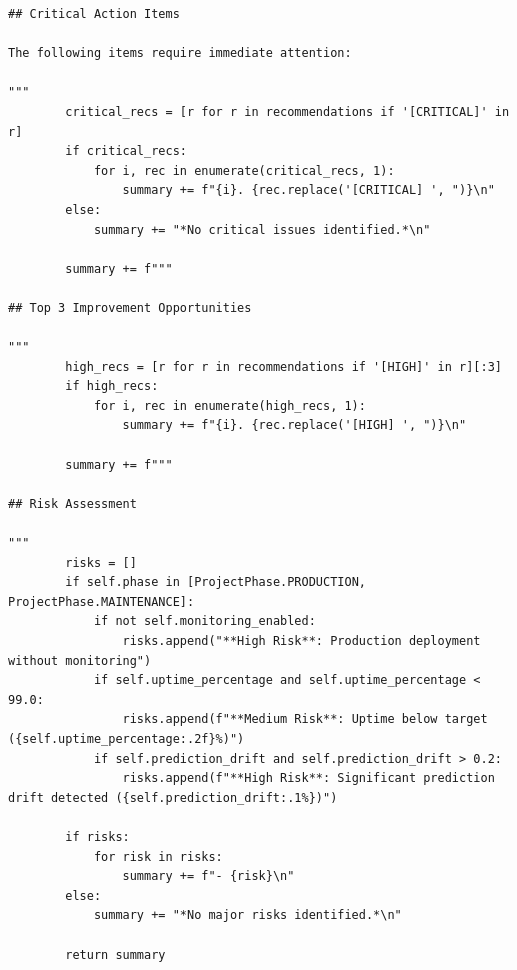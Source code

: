 \begin{lstlisting}[style=python, caption={Comprehensive project health metrics framework with 15+ dimensions}]
## Critical Action Items

The following items require immediate attention:

"""
        critical_recs = [r for r in recommendations if '[CRITICAL]' in r]
        if critical_recs:
            for i, rec in enumerate(critical_recs, 1):
                summary += f"{i}. {rec.replace('[CRITICAL] ', ")}\n"
        else:
            summary += "*No critical issues identified.*\n"

        summary += f"""

## Top 3 Improvement Opportunities

"""
        high_recs = [r for r in recommendations if '[HIGH]' in r][:3]
        if high_recs:
            for i, rec in enumerate(high_recs, 1):
                summary += f"{i}. {rec.replace('[HIGH] ', ")}\n"

        summary += f"""

## Risk Assessment

"""
        risks = []
        if self.phase in [ProjectPhase.PRODUCTION, ProjectPhase.MAINTENANCE]:
            if not self.monitoring_enabled:
                risks.append("**High Risk**: Production deployment without monitoring")
            if self.uptime_percentage and self.uptime_percentage < 99.0:
                risks.append(f"**Medium Risk**: Uptime below target ({self.uptime_percentage:.2f}%)")
            if self.prediction_drift and self.prediction_drift > 0.2:
                risks.append(f"**High Risk**: Significant prediction drift detected ({self.prediction_drift:.1%})")

        if risks:
            for risk in risks:
                summary += f"- {risk}\n"
        else:
            summary += "*No major risks identified.*\n"

        return summary


\end{lstlisting}
